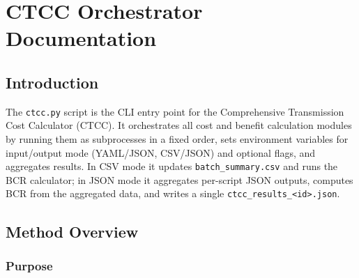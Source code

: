 \documentclass[ctcc_full_documentation.tex]{subfiles}
\begin{document}
\chapter{CTCC Orchestrator Documentation}

\section{Introduction}

The \texttt{ctcc.py} script is the CLI entry point for the Comprehensive Transmission Cost Calculator (CTCC). It orchestrates all cost and benefit calculation modules by running them as subprocesses in a fixed order, sets environment variables for input/output mode (YAML/JSON, CSV/JSON) and optional flags, and aggregates results. In CSV mode it updates \texttt{batch\_summary.csv} and runs the BCR calculator; in JSON mode it aggregates per-script JSON outputs, computes BCR from the aggregated data, and writes a single \texttt{ctcc\_results\_<id>.json}.

\section{Method Overview}

\subsection{Purpose}
\end{document}
